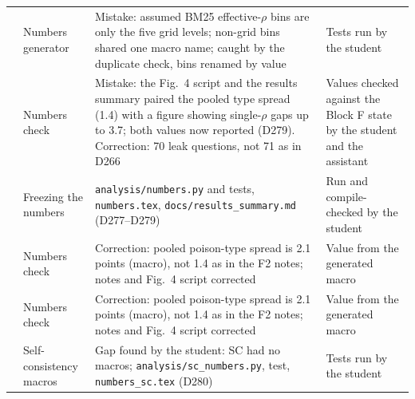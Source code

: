 \documentclass[11pt,a4paper]{report}
\begin{document}
{\begin{longtable}{
  >{\raggedright\arraybackslash}p{0.6cm}
  >{\raggedright\arraybackslash}p{4.4cm}
  >{\raggedright\arraybackslash}p{4.4cm}
  >{\raggedright\arraybackslash}p{4.8cm}}
189 & Numbers generator
  & Mistake: assumed BM25 effective-$\rho$ bins are only the five grid levels; non-grid bins shared one macro name; caught by the duplicate check, bins renamed by value
  & Tests run by the student \\
190 & Numbers check
  & Mistake: the Fig.~4 script and the results summary paired the pooled type spread (1.4) with a figure showing single-$\rho$ gaps up to 3.7; both values now reported (D279). Correction: 70 leak questions, not 71 as in D266
  & Values checked against the Block F state by the student and the assistant \\
191 & Freezing the numbers
  & \texttt{analysis/numbers.py} and tests, \texttt{numbers.tex}, \texttt{docs/results\_summary.md} (D277--D279)
  & Run and compile-checked by the student \\
     192 & Numbers check & Correction: pooled poison-type spread is 2.1 points (macro), not 1.4 as in the F2 notes; notes and Fig.~4 script corrected & Value from the generated macro \\
192 & Numbers check & Correction: pooled poison-type spread is 2.1 points (macro), not 1.4 as in the F2 notes; notes and Fig.~4 script corrected & Value from the generated macro \\

193 & Self-consistency macros & Gap found by the student: SC had no macros; \texttt{analysis/sc\_numbers.py}, test, \texttt{numbers\_sc.tex} (D280) & Tests run by the student \\
\end{longtable}
}


 
 
\end{document}
